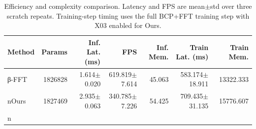 \begin{table}[t]
\centering
\caption{Efficiency and complexity comparison. Latency and FPS are mean$\pm$std over three scratch repeats. Training-step timing uses the full BCP+FFT training step with X03 enabled for Ours.}
\begin{tabular}{lrrrrrr}
\toprule
Method & Params & Inf. Lat. (ms) & FPS & Inf. Mem. & Train Lat. (ms) & Train Mem. \\
\midrule
β-FFT & 1826828 & 1.614$\pm$0.020 & 619.819$\pm$7.614 & 45.063 & 583.174$\pm$18.911 & 13322.333 \\nOurs & 1827469 & 2.935$\pm$0.063 & 340.785$\pm$7.226 & 54.425 & 709.435$\pm$31.135 & 15776.607 \\n\bottomrule
\end{tabular}
\end{table}
